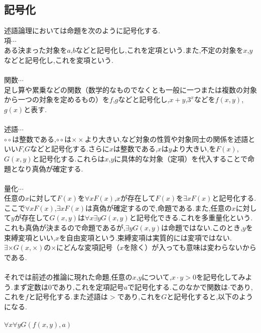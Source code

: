 \documentclass[10pt,b5paper,papersize,dvipdfmx]{jsbook}
\begin{document}
\subsection{記号化}
述語論理においては命題を次のように記号化する. \\
項$\cdots$ \\
ある決まった対象を$a$,$b$などと記号化し,これを定項という.また,不定の対象を$x$,$y$などと記号化し,これを変項という. \\
\\
関数$\cdots$ \\
足し算や累乗などの関数（数学的なものでなくとも一般に一つまたは複数の対象から一つの対象を定めるもの）を$f$,$g$などと記号化し,$x+y$,$3^x$などを$f(x,y)$,$g(x)$と表す. \\
\\
述語$\cdots$　\\
$\circ\circ$は整数である,$\circ\circ$は$\times\times$より大きい,など対象の性質や対象同士の関係を述語といい$F$,$G$などと記号化する.さらに$x$は整数である,$x$は$y$より大きい,を$F(x)$,$G(x,y)$と記号化する.これらは$x$,$y$に具体的な対象（定項）を代入することで命題となり真偽が確定する. \\
\\
量化$\cdots$ \\
任意の$x$に対して$F(x)$を$\forall xF(x)$,$x$が存在して$F(x)$を$\exists xF(x)$と記号化する.ここで$\forall xF(x)$,$\exists xF(x)$は真偽が確定するので,命題である.また,任意の$x$に対して$y$が存在して$G(x,y)$は$\forall x\exists yG(x,y)$と記号化できる.これを多重量化という.これも真偽が決まるので命題であるが,$\exists yG(x,y)$は命題ではない.このとき,$y$を束縛変項といい,$x$を自由変項という.束縛変項は実質的には変項ではない.$\exists \times G(x,\times)$の$\times$にどんな変項記号（$x$を除く）が入っても意味は変わらないからである.\\
\\
それでは前述の推論に現れた命題,任意の$x$,$y$について,$x\cdot y>0$を記号化してみよう.まず定数は$0$であり,これを定項記号$a$で記号化する.このなかで関数は$\cdot$であり,これを$f$と記号化する.また述語は$>$であり,これを$G$と記号化すると,以下のようになる.\\
\\
$\forall x\forall yG(f(x,y),a)$ \\
\end{document}
